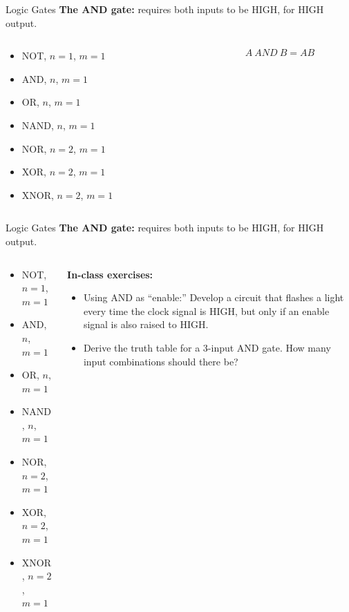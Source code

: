 \documentclass{beamer}
\begin{document}
\begin{frame}{Logic Gates}
\textbf{The AND gate:} requires both inputs to be HIGH, for HIGH output. \\ \vspace{0.5cm}
\begin{columns}[T]
\begin{column}{0.5\textwidth}
\begin{itemize}
\item \alert{NOT, $n=1$, $m=1$}
\item \alert{AND, $n$, $m=1$}
\item OR, $n$, $m=1$
\item NAND, $n$, $m=1$
\item NOR, $n=2$, $m=1$
\item XOR, $n=2$, $m=1$
\item XNOR, $n=2$, $m=1$
\end{itemize}
\end{column}
\begin{column}{0.5\textwidth}
\begin{equation}
A ~ AND ~ B = AB
\end{equation}
\end{column}
\end{columns}
\end{frame}

\begin{frame}{Logic Gates}
\textbf{The AND gate:} requires both inputs to be HIGH, for HIGH output. \\ \vspace{0.5cm}
\begin{columns}[T]
\begin{column}{0.5\textwidth}
\begin{itemize}
\item \alert{NOT, $n=1$, $m=1$}
\item \alert{AND, $n$, $m=1$}
\item OR, $n$, $m=1$
\item NAND, $n$, $m=1$
\item NOR, $n=2$, $m=1$
\item XOR, $n=2$, $m=1$
\item XNOR, $n=2$, $m=1$
\end{itemize}
\end{column}
\begin{column}{0.5\textwidth}
\small 
\textbf{In-class exercises:}
\begin{itemize}
\item Using AND as ``enable:'' Develop a circuit that flashes a light every time the clock signal is HIGH, but only if an enable signal is also raised to HIGH.
\item Derive the truth table for a 3-input AND gate.  How many input combinations should there be?
\end{itemize}
\end{column}
\end{columns}
\end{frame}
\end{document}
